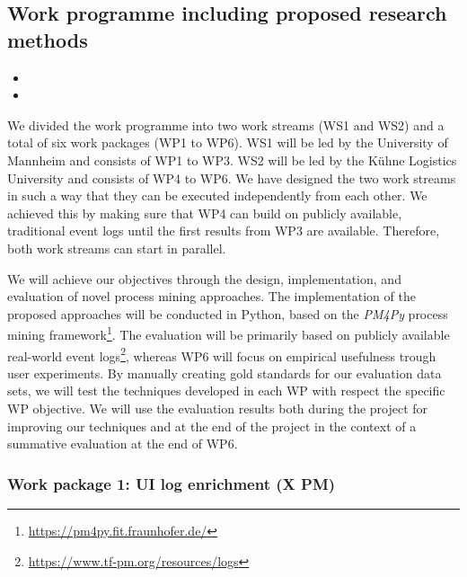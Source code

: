 \subsection{Work programme including proposed research methods}

\begin{itemize}
\item {}
\item {}
\end{itemize}

 We divided the work programme into two work streams (WS1 and WS2) and a total of six work packages (WP1 to WP6). WS1 will be led by the University of Mannheim and consists of WP1 to WP3. WS2 will be led by the Kühne Logistics University and consists of WP4 to WP6. We have designed the two work streams in such a way that they can be executed independently from each other. We achieved this by making sure that WP4 can build on publicly available, traditional event logs until the first results from WP3 are available. Therefore, both work streams can start in parallel. 

 We will achieve our objectives through the design, implementation, and evaluation of novel process mining approaches. The implementation of the proposed approaches will be conducted in Python, based on the \textit{PM4Py} process mining framework\footnote{\url{https://pm4py.fit.fraunhofer.de/}}. The evaluation will be primarily based on publicly available real-world event logs\footnote{\url{https://www.tf-pm.org/resources/logs}}, whereas WP6 will focus on empirical usefulness trough user experiments. By manually creating gold standards for our evaluation data sets, we will test the techniques developed in each WP with respect the specific WP objective. We will use the evaluation results both during the project for improving our techniques and at the end of the project in the context of a summative evaluation at the end of WP6. 
 
\subsubsection{Work package 1: UI log enrichment (X PM)}
\label{sec:wp1}

